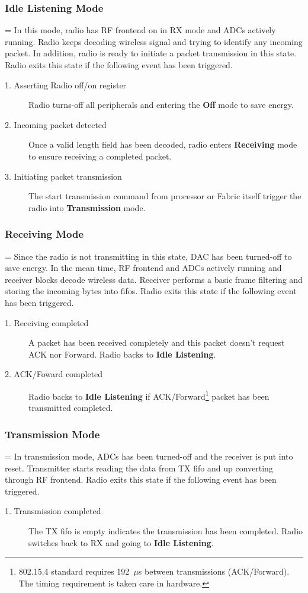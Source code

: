\subsubsection{Idle Listening Mode}
\hangindent=\parindent
{}
In this mode, radio has RF frontend on in RX mode and ADCs actively running. Radio keeps
decoding wireless signal and trying to identify any incoming packet. In addition, radio
is ready to initiate a packet transmission in this state. Radio exits this state if the 
following event has been triggered.
\begin{description}
	\item[1. Asserting Radio off/on register] Radio turns-off all peripherals and 
	entering the {\bf Off} mode to save energy.
	\item[2. Incoming packet detected] Once a valid length field has been decoded, 
	radio enters {\bf Receiving} mode to ensure receiving a completed packet.
	\item[3. Initiating packet transmission] The start transmission command from processor
	or Fabric itself trigger the radio into {\bf Transmission} mode.
\end{description}

\subsubsection{Receiving Mode}
\hangindent=\parindent
{}
Since the radio is not transmitting in this state, DAC has been turned-off to save energy.
In the mean time, RF frontend and ADCs actively running and receiver blocks decode
wireless data. Receiver performs a basic frame filtering and storing the incoming bytes
into fifos. Radio exits this state if the following event has been triggered.
\begin{description}
	\item[1. Receiving completed] A packet has been received completely and this packet
	doesn't request ACK nor Forward. Radio backs to {\bf Idle Listening}.
	\item[2. ACK/Foward completed] Radio backs to {\bf Idle Listening} if ACK/Forward\footnote{
	802.15.4 standard requires 192~$\mu$s between transmissions (ACK/Forward). The 
	timing requirement is taken care in hardware.}
	packet has been transmitted completed.
\end{description}

\subsubsection{Transmission Mode}
\hangindent=\parindent
{}
In transmission mode, ADCs has been turned-off and the receiver is put into reset. Transmitter
starts reading the data from TX fifo and up converting through RF frontend. Radio exits this 
state if the following event has been triggered.
\begin{description}
	\item[1. Transmission completed] The TX fifo is empty indicates the transmission
	has been completed. Radio switches back to RX and going to {\bf Idle Listening}.
\end{description}

